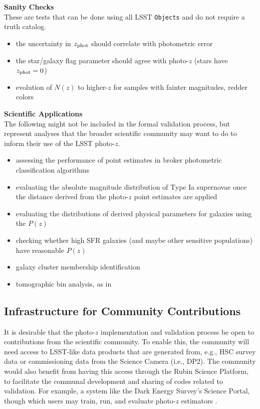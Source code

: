 \documentclass[DM,lsstdraft,toc]{lsstdoc}
\begin{document}
{\bf Sanity Checks}\\
These are tests that can be done using all LSST {\tt Objects} and do not require a truth catalog.
\vspace{-15pt}
\begin{itemize}
\item the uncertainty in $z_{\rm phot}$ should correlate with photometric error
\item the star/galaxy flag parameter should agree with photo-$z$ (stars have $z_{\rm phot}=0$)
\item evolution of $N(z)$ to higher-$z$ for samples with fainter magnitudes, redder colors
\end{itemize}

{\bf Scientific Applications}\\
The following might not be included in the formal validation process, but represent analyses that the broader scientific community may want to do to inform their use of the LSST photo-$z$.
\vspace{-15pt}
\begin{itemize}
\item assessing the performance of point estimates in broker photometric classification algorithms
\item evaluating the absolute magnitude distribution of Type Ia supernovae once the distance derived from the photo-$z$ point estimates are applied
\item evaluating the distributions of derived physical parameters for galaxies using the $P(z)$
\item checking whether high SFR galaxies (and maybe other sensitive populations) have reasonable $P(z)$
\item galaxy cluster membership identification
\item tomographic bin analysis, as in \citep{2019MNRAS.482.2807C}
\end{itemize}


\subsection{Infrastructure for Community Contributions}\label{ssec:imp_community}

It is desirable that the photo-$z$ implementation and validation process be open to contributions from the scientific community.
To enable this, the community will need access to LSST-like data products that are generated from, e.g., HSC survey data or commissioning data from the Science Camera (i.e., DP2).
The community would also benefit from having this access through the Rubin Science Platform, to facilitate the communal development and sharing of codes related to validation.
For example, a system like the Dark Energy Survey's Science Portal, though which users may train, run, and evaluate photo-$z$ estimators \citet{2018A&C....25...58G}.
\end{document}
